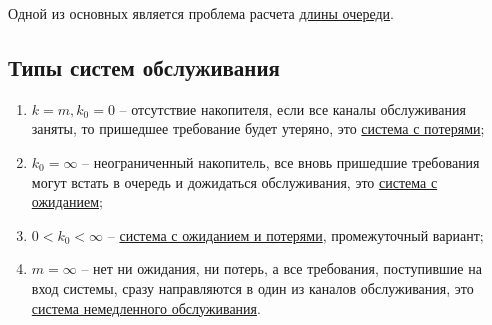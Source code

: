 Одной из основных является проблема расчета \underline{длины очереди}.

\subsection{Типы систем обслуживания}

\begin{enumerate}
	\item $k = m, k_0 = 0$ -- отсутствие накопителя, если все каналы обслуживания заняты, то пришедшее требование будет утеряно, это \underline{система с потерями};
	\item $k_0 = \infty$ -- неограниченный накопитель, все вновь пришедшие требования могут встать в очередь и дожидаться обслуживания, это \underline{система с ожиданием};
	\item $0 < k_0 < \infty$ -- \underline{система с ожиданием и потерями}, промежуточный вариант;
	\item $m = \infty$ -- нет ни ожидания, ни потерь, а все требования, поступившие на вход системы, сразу направляются в один из каналов обслуживания, это \underline{система немедленного обслуживания}. 
\end{enumerate}